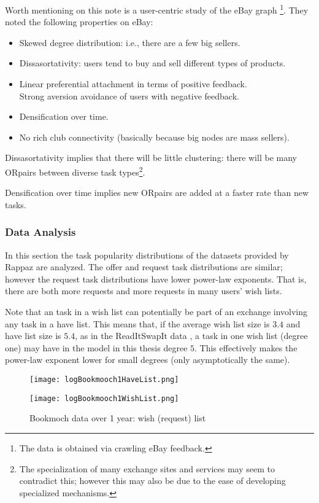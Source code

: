 \documentclass[main.tex]{subfiles}
\begin{document}
Worth mentioning on this note is a user-centric study of the eBay graph \cite{ebay}\footnote{The data is obtained via crawling eBay feedback.}. They noted the following properties on eBay:

\begin{itemize}
  \item Skewed degree distribution: i.e., there are a few big sellers.
  \item Dissasortativity: users tend to buy and sell different types of products.
  \item Linear preferential attachment in terms of positive feedback.
     \\ Strong aversion avoidance of users with negative feedback.
  \item Densification over time.
  \item No rich club connectivity (basically because big nodes are mass sellers).
\end{itemize}

Dissasortativity implies that there will be little clustering: there will be many ORpairs between diverse task types\footnote{The specialization of many exchange sites and services may seem to contradict this; however this may also be due to the ease of developing specialized mechanisms.}.

Densification over time implies new ORpairs are added at a faster rate than new tasks.

\subsubsection{Data Analysis}
In this section the task popularity distributions of the datasets provided by Rappaz \cite{Rap1} are analyzed. The offer and request task distributions are similar; however the request task distributions have lower power-law exponents. That is, there are both more requests and more requests in many users' wish lists.

Note that an task in a wish list can potentially be part of an exchange involving any task in a have list. This means that, if the average wish list size is $3.4$ and have list size is $5.4$, as in the ReadItSwapIt data \cite{Abb2}, a task in one wish list (degree one) may have in the model in this thesis degree $5$. This effectively makes the power-law exponent lower for small degrees (only asymptotically the same).

\begin{figure}[!tbp]
  \centering
  \begin{minipage}[b]{0.45\textwidth}
    \texttt{[image: logBookmooch1HaveList.png]}
    \caption{Bookmooch data over 1 year: have (offer) list}
  \end{minipage}
  \hfill
  \begin{minipage}[b]{0.45\textwidth}
    \texttt{[image: logBookmooch1WishList.png]}
    \caption{Bookmoch data over 1 year: wish (request) list}
  \end{minipage}
\end{figure}
\end{document}
